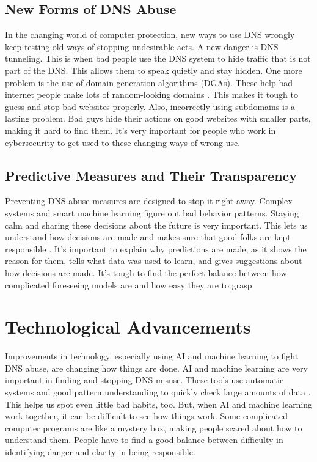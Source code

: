 \subsection{New Forms of DNS Abuse}

In the changing world of computer protection, new ways to use DNS wrongly keep testing old ways of stopping undesirable acts. A new danger is DNS tunneling. This is when bad people use the DNS system to hide traffic that is not part of the DNS. This allows them to speak quietly and stay hidden. One more problem is the use of domain generation algorithms (DGAs). These help bad internet people make lots of random-looking domains \cite{kaur2023artificial}. This makes it tough to guess and stop bad websites properly. Also, incorrectly using subdomains is a lasting problem. Bad guys hide their actions on good websites with smaller parts, making it hard to find them. It's very important for people who work in cybersecurity to get used to these changing ways of wrong use.

\subsection{Predictive Measures and Their Transparency}

Preventing DNS abuse measures are designed to stop it right away. Complex systems and smart machine learning figure out bad behavior patterns. Staying calm and sharing these decisions about the future is very important. This lets us understand how decisions are made and makes sure that good folks are kept responsible \cite{hussain2022software}. It's important to explain why predictions are made, as it shows the reason for them, tells what data was used to learn, and gives suggestions about how decisions are made. It's tough to find the perfect balance between how complicated foreseeing models are and how easy they are to grasp.

\section{Technological Advancements}

Improvements in technology, especially using AI and machine learning to fight DNS abuse, are changing how things are done. AI and machine learning are very important in finding and stopping DNS misuse. These tools use automatic systems and good pattern understanding to quickly check large amounts of data \cite{goethals2021enabling}. This helps us spot even little bad habits, too. But, when AI and machine learning work together, it can be difficult to see how things work. Some complicated computer programs are like a mystery box, making people scared about how to understand them. People have to find a good balance between difficulty in identifying danger and clarity in being responsible.

